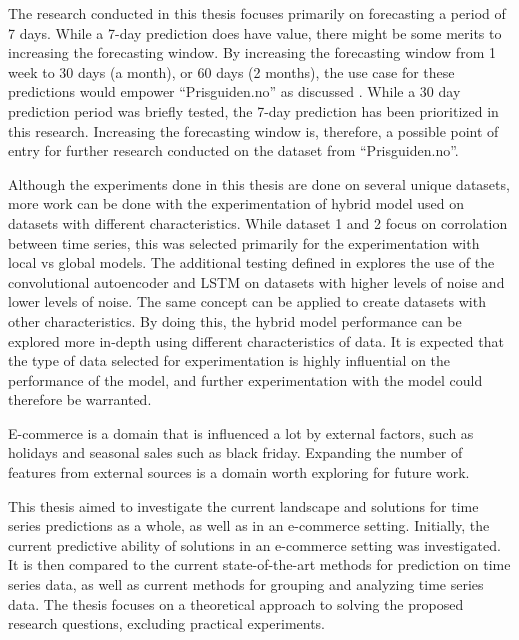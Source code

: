 The research conducted in this thesis focuses primarily on forecasting a period of 7 days.
While a 7-day prediction does have value,
there might be some merits to increasing the forecasting window.
By increasing the forecasting window from 1 week to 30 days (a month), or 60 days (2 months),
the use case for these predictions would empower ``Prisguiden.no'' as discussed .
While a 30 day prediction period was briefly tested,
the 7-day prediction has been prioritized in this research.
Increasing the forecasting window is, therefore, a possible point of entry for further research conducted on the
dataset from ``Prisguiden.no''.


Although the experiments done in this thesis are done on several unique datasets,
more work can be done with the experimentation of hybrid model used on datasets with different characteristics.
While dataset 1 and 2 focus on corrolation between time series, this was selected primarily for the experimentation with local vs global models.
The additional testing defined in  explores the use of the convolutional autoencoder and LSTM
on datasets with higher levels of noise and lower levels of noise.
The same concept can be applied to create datasets with other characteristics.
By doing this, the hybrid model performance can be explored more in-depth using different characteristics of data.
It is expected that the type of data selected for experimentation is highly influential on the performance of the model,
and further experimentation with the model could therefore be warranted.

E-commerce is a domain that is influenced a lot by external factors, such as holidays and seasonal sales such as black friday.
Expanding the number of features from external sources is a domain worth exploring for future work.



\iffalse
  This thesis aimed to investigate the current landscape and solutions for time series predictions as a whole,
  as well as in an e-commerce setting.
  Initially, the current predictive ability of solutions in an e-commerce setting was investigated.
  It is then compared to the current state-of-the-art methods for prediction on time series data,
  as well as current methods for grouping and analyzing time series data.
  The thesis focuses on a theoretical approach to solving the proposed research questions,
  excluding practical experiments.

